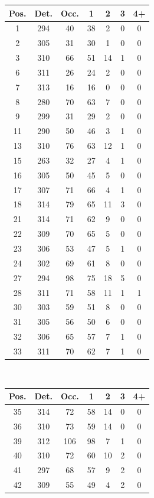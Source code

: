 \documentclass[pdftex,12pt,a4paper]{report}
\begin{document}
\begin{appendices}
\begin{table}[H]
\begin{tabular}[t]{ c | c | c | c | c | c | c }
\hline
Pos. & Det. & Occ. & 1 & 2 & 3 & 4+
\\
\hline\hline
1 & 294 & 40 & 38 & 2 & 0 & 0
\\
2 & 305 & 31 & 30 & 1 & 0 & 0
\\
3 & 310 & 66 & 51 & 14 & 1 & 0
\\
6 & 311 & 26 & 24 & 2 & 0 & 0
\\
7 & 313 & 16 & 16 & 0 & 0 & 0
\\
8 & 280 & 70 & 63 & 7 & 0 & 0
\\
9 & 299 & 31 & 29 & 2 & 0 & 0
\\
11 & 290 & 50 & 46 & 3 & 1 & 0
\\
13 & 310 & 76 & 63 & 12 & 1 & 0
\\
15 & 263 & 32 & 27 & 4 & 1 & 0
\\
16 & 305 & 50 & 45 & 5 & 0 & 0
\\
17 & 307 & 71 & 66 & 4 & 1 & 0
\\
18 & 314 & 79 & 65 & 11 & 3 & 0
\\
21 & 314 & 71 & 62 & 9 & 0 & 0
\\
22 & 309 & 70 & 65 & 5 & 0 & 0
\\
23 & 306 & 53 & 47 & 5 & 1 & 0
\\
24 & 302 & 69 & 61 & 8 & 0 & 0
\\
27 & 294 & 98 & 75 & 18 & 5 & 0
\\
28 & 311 & 71 & 58 & 11 & 1 & 1
\\
30 & 303 & 59 & 51 & 8 & 0 & 0
\\
31 & 305 & 56 & 50 & 6 & 0 & 0
\\
32 & 306 & 65 & 57 & 7 & 1 & 0
\\
33 & 311 & 70 & 62 & 7 & 1 & 0
\\
\hline
\end{tabular}
~
\begin{tabular}[t]{ c | c | c | c | c | c | c }
\hline
Pos. & Det. & Occ. & 1 & 2 & 3 & 4+
\\
\hline\hline
35 & 314 & 72 & 58 & 14 & 0 & 0
\\
36 & 310 & 73 & 59 & 14 & 0 & 0
\\
39 & 312 & 106 & 98 & 7 & 1 & 0
\\
40 & 310 & 72 & 60 & 10 & 2 & 0
\\
41 & 297 & 68 & 57 & 9 & 2 & 0
\\
42 & 309 & 55 & 49 & 4 & 2 & 0
\\

\end{tabular}
\end{table}
\end{appendices}
\end{document}
